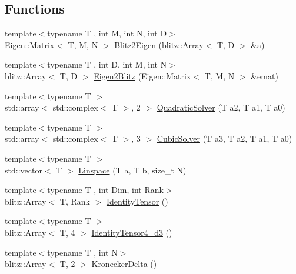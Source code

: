 \subsection*{Functions}
\begin{DoxyCompactItemize}
\item 
{\footnotesize template$<$typename T , int M, int N, int D$>$ }\\Eigen\+::\+Matrix$<$ T, M, N $>$ \mbox{\hyperlink{namespacempc_1_1utilities_afb1a22ab436781cf5a791680bc60988f}{Blitz2\+Eigen}} (blitz\+::\+Array$<$ T, D $>$ \&a)
\item 
{\footnotesize template$<$typename T , int D, int M, int N$>$ }\\blitz\+::\+Array$<$ T, D $>$ \mbox{\hyperlink{namespacempc_1_1utilities_a08e3db41de91c76d936475136d35da9e}{Eigen2\+Blitz}} (Eigen\+::\+Matrix$<$ T, M, N $>$ \&emat)
\item 
{\footnotesize template$<$typename T $>$ }\\std\+::array$<$ std\+::complex$<$ T $>$, 2 $>$ \mbox{\hyperlink{namespacempc_1_1utilities_ad175f8823052a6c863ffb2e90e2b08ca}{Quadratic\+Solver}} (T a2, T a1, T a0)
\item 
{\footnotesize template$<$typename T $>$ }\\std\+::array$<$ std\+::complex$<$ T $>$, 3 $>$ \mbox{\hyperlink{namespacempc_1_1utilities_adbffd8dee20ff121f91cf6be9e19a1b3}{Cubic\+Solver}} (T a3, T a2, T a1, T a0)
\item 
{\footnotesize template$<$typename T $>$ }\\std\+::vector$<$ T $>$ \mbox{\hyperlink{namespacempc_1_1utilities_abb6b125ee38967fe00a7f47bf087b75a}{Linspace}} (T a, T b, size\+\_\+t N)
\item 
{\footnotesize template$<$typename T , int Dim, int Rank$>$ }\\blitz\+::\+Array$<$ T, Rank $>$ \mbox{\hyperlink{namespacempc_1_1utilities_a9fb6465091d6aeb8c9b16807c3bb7c72}{Identity\+Tensor}} ()
\item 
{\footnotesize template$<$typename T $>$ }\\blitz\+::\+Array$<$ T, 4 $>$ \mbox{\hyperlink{namespacempc_1_1utilities_a96edb2d899d84f585e1ca4fb2cdb15f4}{Identity\+Tensor4\+\_\+d3}} ()
\item 
{\footnotesize template$<$typename T , int N$>$ }\\blitz\+::\+Array$<$ T, 2 $>$ \mbox{\hyperlink{namespacempc_1_1utilities_aee39ac77e4aad3a854879829eed39b37}{Kronecker\+Delta}} ()
\item 

\end{DoxyCompactItemize}
